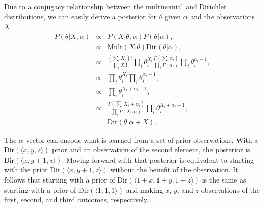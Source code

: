 Due to a conjugacy relationship between the multinomial and Dirichlet distributions, we can easily derive a posterior for $\theta$ given $\alpha$ and the observations $X$.
\begin{eqnarray}
P(\theta|X,\alpha) &\propto& P(X|\theta,\alpha) P(\theta|\alpha),\\
&\propto& \mbox{Mult}(X|\theta) \mbox{Dir}(\theta|\alpha),\\
&\propto& \frac{\left(\sum_i X_i\right)!}{\prod_i X_i!} \prod_i \theta_i^{X_i} \frac{\Gamma\left(\sum_i \alpha_i\right)}{\prod_i \Gamma(\alpha_i)} \prod_i \theta_i^{\alpha_i-1},\\
&\propto& \prod_i \theta_i^{X_i} \prod_i \theta_i^{\alpha_i-1},\\
&\propto& \prod_i \theta_i^{X_i+\alpha_i-1},\\
&\propto& \frac{\Gamma\left(\sum_i X_i+\alpha_i\right)}{\prod_i \Gamma(X_i\alpha_i)} \prod_i \theta_i^{X_i+\alpha_i-1},\\
&=& \mbox{Dir}(\theta|\alpha+X). \label{sec:models:dir-mult-conj}
\end{eqnarray}

The $\alpha$ vector can encode what is learned from a set of prior observations. With a $\mbox{Dir}(\langle x, y, z \rangle)$ prior and an observation of the second element, the posterior is $\mbox{Dir}(\langle x, y+1, z \rangle)$. Moving forward with that posterior is equivalent to starting with the prior $\mbox{Dir}(\langle x, y+1, z \rangle)$ without the benefit of the observation. It follows that starting with a prior of $\mbox{Dir}(\langle 1+x, 1+y, 1+z \rangle)$ is the same as starting with a prior of $\mbox{Dir}(\langle 1, 1, 1 \rangle)$ and making $x$, $y$, and $z$ observations of the first, second, and third outcomes, respectively.


